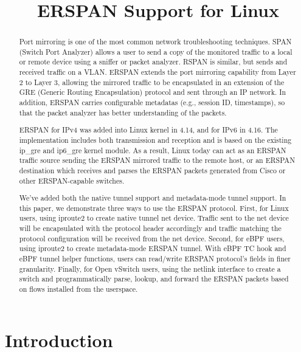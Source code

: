 \documentclass{sigplanconf}
\begin{document}
\title{ERSPAN Support for Linux}
{}{}

\maketitle

\begin{abstract}
Port mirroring is one of the most common network troubleshooting techniques.
SPAN (Switch Port Analyzer) allows a user to send a copy of the monitored traffic
to a local or remote device using a sniffer or packet analyzer.
RSPAN is similar, but sends and received traffic on a VLAN. ERSPAN extends the
port mirroring capability from Layer 2 to Layer 3, allowing the mirrored traffic
to be encapsulated in an extension of the GRE (Generic Routing Encapsulation) protocol
and sent through an IP network.  In addition, ERSPAN carries configurable metadatas
(e.g., session ID, timestamps), so that the packet analyzer has better understanding
of the packets.

ERSPAN for IPv4 was added into Linux kernel in 4.14, and for IPv6 in 4.16.
The implementation includes both transmission and reception and is based on the
existing ip\_gre and ip6\_gre kernel module.  As a result, Linux today can act as
an ERSPAN traffic source sending the ERSPAN mirrored traffic to the remote host,
or an ERSPAN destination which receives and parses the ERSPAN packets generated
from Cisco or other ERSPAN-capable switches.
  
We’ve added both the native tunnel support and metadata-mode tunnel support.
In this paper, we demonstrate three ways to use the ERSPAN protocol.
First, for Linux users, using iproute2 to create native tunnel net device.
Traffic sent to the net device will be encapsulated with the protocol header
accordingly and traffic matching the protocol configuration will be received
from the net device.  Second, for eBPF users, using iproute2 to create metadata-mode
ERSPAN tunnel.  With eBPF TC hook and eBPF tunnel helper functions, users can
read/write ERSPAN protocol’s fields in finer granularity.
Finally, for Open vSwitch users, using the netlink interface to create a switch
and programmatically parse, lookup, and forward the ERSPAN packets based on flows
installed from the userspace.

\end{abstract}

\section{Introduction}\label{introduction}
\end{document}
